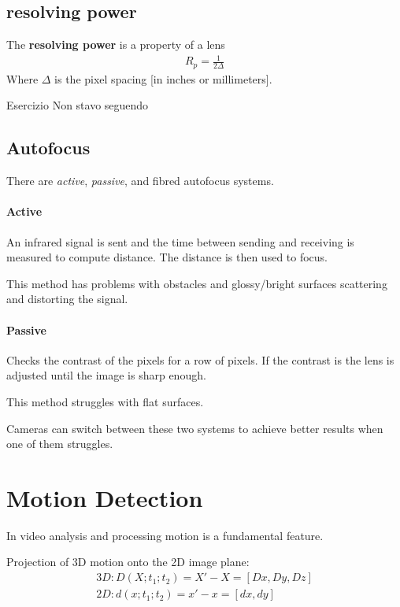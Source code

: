 \documentclass{article}
\begin{document}
\subsection{resolving power}
The \textbf{resolving power} is a property of a lens
\begin{align*}
    R_p = \frac{1}{2\Delta}
\end{align*}
Where $\Delta$ is the pixel spacing [in inches or millimeters].
\begin{callout}{Esercizio}
    Non stavo seguendo
\end{callout}

\subsection{Autofocus}
There are \textit{active}, \textit{passive}, and fibred autofocus systems.

\paragraph{Active}
An infrared signal is sent and the time between sending and receiving is measured to compute distance. The distance is then used to focus.

This method has problems with obstacles and glossy/bright surfaces scattering and distorting the signal.

\paragraph{Passive}
Checks the contrast of the pixels for a row of pixels. If the contrast is the lens is adjusted until the image is sharp enough.

This method struggles with flat surfaces.

Cameras can switch between these two systems to achieve better results when one of them struggles.

\section{Motion Detection}
In video analysis and processing motion is a fundamental feature.

Projection of 3D motion onto the 2D image plane:
\begin{gather*}
3D: D(X; t_1; t_2) = X' - X = [Dx,Dy,Dz] \\
2D: d(x; t_1; t_2) = x' - x = [dx, dy] 
\end{gather*}
\end{document}

